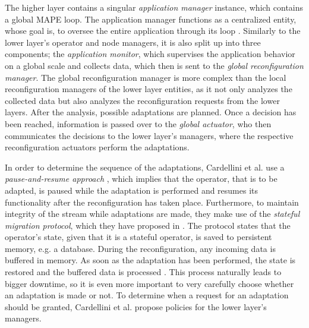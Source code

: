         \quad The higher layer contains a singular \textit{application manager} instance, which contains a global MAPE loop.
        The application manager functions as a centralized entity, whose goal is, to oversee the entire application through its loop \cite[p. 176]{cardellini}.
        Similarly to the lower layer's operator and node managers, it is also split up into three components;
        the \textit{application monitor}, which supervises the application behavior on a global scale and collects data, which then is sent to the \textit{global reconfiguration manager}.
        The global reconfiguration manager is more complex than the local reconfiguration managers of the lower layer entities, as it not only analyzes the collected data but 
        also analyzes the reconfiguration requests from the lower layers. After the analysis, possible adaptations are planned.
        Once a decision has been reached, information is passed over to the \textit{global actuator}, who then communicates the decisions to the lower layer's managers, 
        where the respective reconfiguration actuators perform the adaptations.
        
        \quad In order to determine the sequence of the adaptations, Cardellini et al. use a \textit{pause-and-resume approach} \cite{Heinze2014CloudbasedDS}, 
        which implies that the operator, that is to be adapted, is paused while the adaptation is performed and resumes its functionality after the 
        reconfiguration has taken place. 
        Furthermore, to maintain integrity of the stream while adaptations are made, they make use of the \textit{stateful migration protocol}, 
        which they have proposed in \cite{migrationProtocol}. The protocol states that the operator's state, given that it is a stateful operator, 
        is saved to persistent memory, e.g. a database. During the reconfiguration, any incoming data is buffered in memory.
        As soon as the adaptation has been performed, the state is restored and the buffered data is processed \cite[p. 176]{cardellini}.
        This process naturally leads to bigger downtime, so it is even more important to very carefully choose whether an adaptation is made or not.
        To determine when a request for an adaptation should be granted, Cardellini et al. propose policies for the lower layer's managers.

